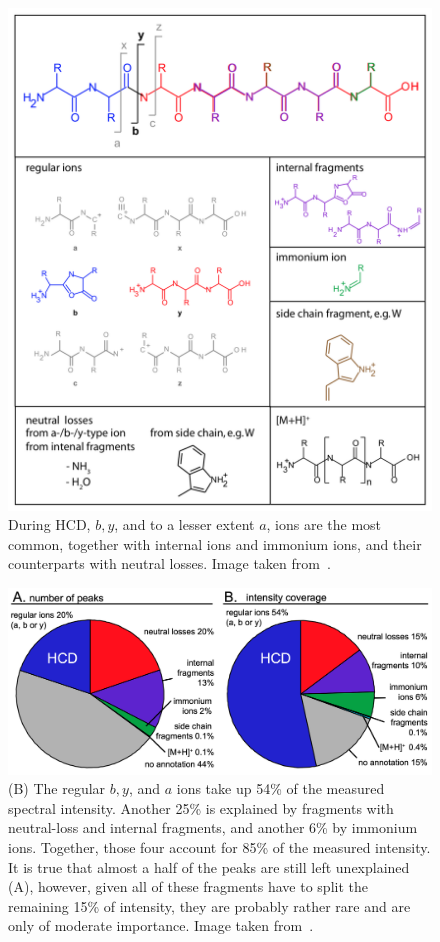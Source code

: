 \begin{figure}
  \centering
  \includegraphics[width=.9\linewidth]{img/fragment-types-hcd.png}
  \caption{During HCD, \(b, y\), and to a lesser extent \(a\), ions are the most common, together with internal ions and immonium ions, and their counterparts with neutral losses. Image taken from~\citet{michalski2012systematic}.}\label{fig:fragment-types-hcd}
\end{figure}

\begin{figure}
  \centering
  \includegraphics[width=.9\linewidth]{img/hcd.png}
  \caption{(B) The regular \(b, y\), and \(a\) ions take up 54\% of the measured spectral intensity. Another 25\% is explained by fragments with neutral-loss and internal fragments, and another 6\% by immonium ions. Together, those four account for 85\% of the measured intensity. It is true that almost a half of the peaks are still left unexplained (A), however, given all of these fragments have to split the remaining 15\% of intensity, they are probably rather rare and are only of moderate importance. Image taken from~\citet{michalski2012systematic}.}\label{fig:hcd}
\end{figure}

